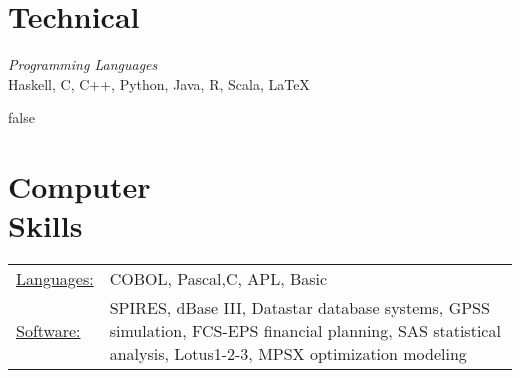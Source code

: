 \documentclass[margin]{res}
\begin{document}
\begin{resume}
\section{Technical}
\textit{Programming Languages} \\
Haskell, C, C++, Python, Java, R, Scala, \LaTeX
 

\if false
\section{Computer \\ Skills}
   \begin{tabular}{l p{3in}}
    \underline{Languages:} & COBOL, Pascal,C, APL, Basic \\

     \underline{Software:} &  SPIRES, dBase III, Datastar database 
                        systems, GPSS simulation, FCS-EPS financial 
                        planning, SAS statistical analysis, 
                        Lotus1-2-3, MPSX optimization modeling 
   \end{tabular}
 \fi

\end{resume} 
\end{document}

